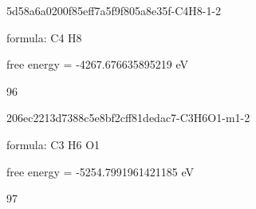 \documentclass{article}
\begin{document}
\vspace{1cm}


5d58a6a0200f85eff7a5f9f805a8e35f-C4H8-1-2



formula: C4 H8



free energy = -4267.676635895219 eV

96

\vspace{1cm}


206ec2213d7388c5e8bf2cff81dedac7-C3H6O1-m1-2



formula: C3 H6 O1



free energy = -5254.7991961421185 eV

97
\end{document}
